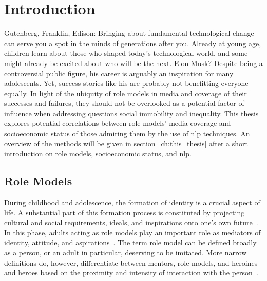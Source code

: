 \renewcommand{\imagepath}{../10-intro/img}

\chapter{Introduction}
Gutenberg, Franklin, Edison: Bringing about fundamental technological change can serve you a spot in the minds of generations after you. Already at young age, children learn about those who shaped today's technological world, and some might already be excited about who will be the next. Elon Musk? Despite being a controversial public figure, his career is arguably an inspiration for many adolescents. Yet, success stories like his are probably not benefitting everyone equally. In light of the ubiquity of role models in media and coverage of their successes and failures, they should not be overlooked as a potential factor of influence when addressing questions social immobility and inequality. This thesis explores potential correlations between role models' media coverage and socioeconomic status of those admiring them by the use of \gls{nlp} techniques. An overview of the methods will be given in section~\ref{ch:this_thesis} after a short introduction on role models, socioeconomic status, and \gls{nlp}.

\section{Role Models}
During childhood and adolescence, the formation of identity is a crucial aspect of life. A substantial part of this formation process is constituted by projecting cultural and social requirements, ideals, and inspirations onto one's own future~\autocite{mcadams_psychology_2001}. In this phase, adults acting as role models play an important role as mediators of identity, attitude, and aspirations~\autocite{hurd_role_2011-1, morgenroth_how_2015}. The term role model can be defined broadly as a person, or an adult in particular, deserving to be imitated. More narrow definitions do, however, differentiate between mentors, role models, and heroines and heroes based on the proximity and intensity of interaction with the person~\autocite{pleiss_mentors_1995}.


